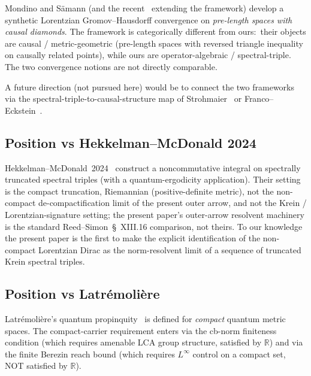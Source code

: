 \documentclass[11pt,a4paper]{article}
\theoremstyle{plain}
\theoremstyle{definition}
\newcommand{\R}{\mathbb{R}}
\begin{document}
Mondino and S\"amann
\cite{mondino_samann2025} (and the
recent~\cite{che_perales_sormani2025} extending the framework) develop
a synthetic Lorentzian Gromov--Hausdorff convergence on
\emph{pre-length spaces with causal diamonds}. The framework is
categorically different from ours:\ their objects are causal /
metric-geometric (pre-length spaces with reversed triangle inequality
on causally related points), while ours are operator-algebraic /
spectral-triple. The two convergence notions are not directly
comparable.

A future direction (not pursued here) would be to connect the two
frameworks via the spectral-triple-to-causal-structure map of
Strohmaier~\cite{strohmaier2006} or
Franco--Eckstein~\cite{franco_eckstein2014}.

\subsection{Position vs Hekkelman--McDonald 2024}\label{sec:vs_hm}

Hekkelman--McDonald~2024~\cite{hekkelman_mcdonald2024} construct a
noncommutative integral on spectrally truncated spectral triples (with
a quantum-ergodicity application). Their setting is the compact
truncation, Riemannian (positive-definite metric), not the non-compact
de-compactification limit of the present outer arrow, and not the
Krein / Lorentzian-signature setting; the present paper's outer-arrow
resolvent machinery is the standard Reed--Simon~\S~XIII.16 comparison,
not theirs. To our knowledge the present paper is the first to make the
explicit identification of the non-compact
Lorentzian Dirac as the norm-resolvent limit of a sequence of
truncated Krein spectral triples.

\subsection{Position vs Latr\'emoli\`ere}\label{sec:vs_latremoliere}

Latr\'emoli\`ere's quantum
propinquity~\cite{latremoliere_metric_st_2017,latremoliere2018,
farsi_latremoliere2025} is defined for
\emph{compact} quantum metric spaces. The compact-carrier requirement
enters via the cb-norm finiteness condition (which requires amenable
LCA group structure, satisfied by $\R$) and via the finite Berezin
reach bound (which requires $L^{\infty}$ control on a compact set, NOT
satisfied by $\R$).
\end{document}
